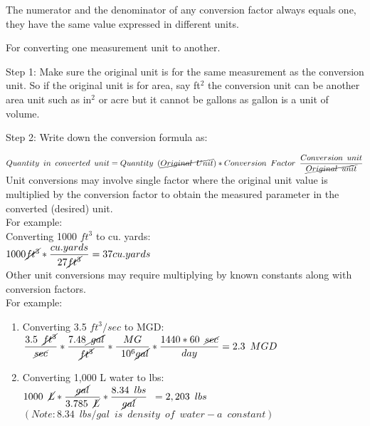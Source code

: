 The numerator and the denominator of any conversion factor always equals one, they have the same value expressed in different units.

For converting one measurement unit to another.

Step 1:  Make sure the original unit is for the same measurement as the conversion unit.  So if the original unit is for area, say ft$^2$ the conversion unit can be another area unit such as in$^2$ or acre but it cannot be gallons as gallon is a unit of volume.

Step 2: Write down the conversion formula as:

$Quantity \enspace in \enspace converted \enspace unit = Quantity \enspace (\cancel{Original \enspace Unit}) *   Conversion  \enspace Factor \enspace  \dfrac{Conversion \enspace unit}{\cancel{Original \enspace unit}}$\\
\hspace{0.2cm}
Unit conversions may involve single factor where the original unit value is multiplied by the conversion factor to obtain the measured parameter in the converted (desired) unit.\\
For example:\\  
Converting 1000 $ft^3$ to cu. yards:\\

$1000 \cancel{ft^3}*\dfrac{cu.yards}{27\cancel{ft^3}} = 37 cu.yards$\\

Other unit conversions may require multiplying by known constants along with conversion factors.\\
For example:\\
\begin{enumerate}  

\item Converting 3.5 $ft^3/sec$ to MGD:\\
$\dfrac{3.5 \enspace \cancel{ft^3}}{\cancel{sec}} * \dfrac{7.48\cancel {\enspace gal}}{\cancel{ft^3}} * \dfrac{MG}{\enspace 10^6 \cancel{gal}}* \dfrac{1440*60 \enspace \cancel{sec}}{day}=  2.3 \enspace MGD$\\

\item Converting 1,000 L water to lbs:\\
$1000 \enspace \cancel{L}*\dfrac {\cancel{gal}}{3.785 \enspace \cancel{L}}*\dfrac{8.34 \enspace lbs}{\cancel{gal}}\enspace  = 2,203 \enspace lbs$\\
$(Note:8.34 \enspace lbs/gal \enspace is \enspace density \enspace of \enspace water - a \enspace constant)$\\ 

\end{enumerate}
